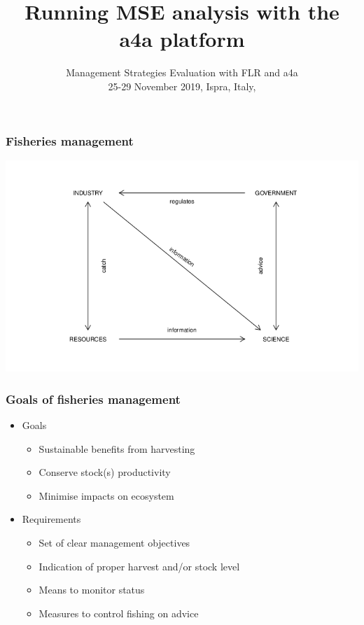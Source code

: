 \documentclass{beamer}\usepackage[]{graphicx}\usepackage[]{xcolor}
\title{Running MSE analysis with the a4a platform}
\subtitle{Management Strategies Evaluation with FLR and a4a \\ 25-29 November 2019, Ispra, Italy, }
\begin{document}


\begin{frame}
\titlepage


\end{frame}

\begin{frame}
\frametitle{Fisheries management}

\begin{center}
\includegraphics[height=0.95\textheight]{figs/fmanag}
\end{center}

\end{frame}

\begin{frame}
\frametitle{Goals of fisheries management}

\begin{itemize}
  \item Goals
  \begin{itemize}
    \item Sustainable benefits from harvesting
    \item Conserve stock(s) productivity
    \item Minimise impacts on ecosystem
  \end{itemize}
    \item Requirements
  \begin{itemize}
    \item Set of clear management objectives
    \item Indication of proper harvest and/or stock level
    \item Means to monitor status
    \item Measures to control fishing on advice
  \end{itemize}
\end{itemize}

\end{frame}
\end{document}
